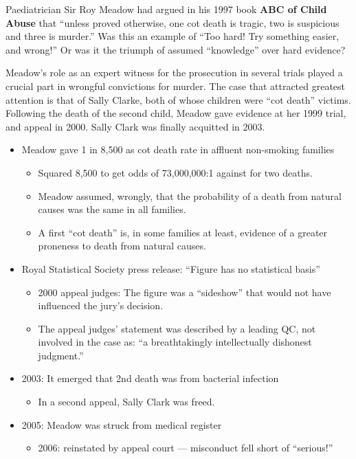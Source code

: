 \documentclass[
  10pt,
  b5paper]{book}
\providecommand{\tightlist}{%
  \setlength{\itemsep}{0pt}\setlength{\parskip}{0pt}}
\begin{document}
Paediatrician Sir Roy Meadow had argued in his 1997 book
\textbf{ABC of Child Abuse} that ``unless proved otherwise,
one cot death is tragic, two is suspicious and three is murder.''
Was this an example of ``Too hard! Try something easier, and wrong!''
Or was it the triumph of assumed ``knowledge'' over hard evidence?

Meadow's role as an expert witness for the prosecution in several
trials played a crucial part in wrongful convictions for murder.
The case that attracted greatest attention is that of Sally Clarke,
both of whose children were ``cot death'' victims. Following the
death of the second child, Meadow gave evidence at her 1999 trial,
and appeal in 2000. Sally Clark was finally acquitted in 2003.

\begin{itemize}
\tightlist
\item
  Meadow gave 1 in 8,500 as cot death rate in affluent non-smoking families

  \begin{itemize}
  \tightlist
  \item
    Squared 8,500 to get odds of 73,000,000:1 against for two deaths.
  \item
    Meadow assumed, wrongly, that the probability of a death from
    natural causes was the same in all families.
  \item
    A first ``cot death'' is, in some families at least, evidence of a greater
    proneness to death from natural causes.
  \end{itemize}
\item
  Royal Statistical Society press release: ``Figure has no statistical basis''

  \begin{itemize}
  \tightlist
  \item
    2000 appeal judges: The figure was a
    ``sideshow'' that would not have influenced the jury's decision.
  \item
    The appeal judges' statement was described by a leading QC, not
    involved in the case as: ``a breathtakingly intellectually dishonest
    judgment.''
  \end{itemize}
\item
  2003: It emerged that 2nd death was from bacterial infection

  \begin{itemize}
  \tightlist
  \item
    In a second appeal, Sally Clark was freed.
  \end{itemize}
\item
  2005: Meadow was struck from medical register

  \begin{itemize}
  \tightlist
  \item
    2006: reinstated by appeal court --- misconduct fell short
    of ``serious!''
  \end{itemize}
\end{itemize}
\end{document}
